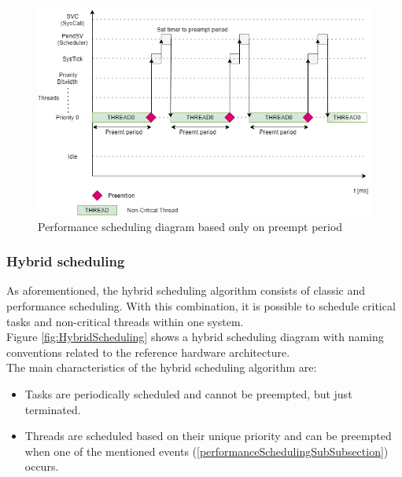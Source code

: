 \begin{figure}[H]
\begin{center}
\includegraphics[width=1\textwidth]{images/performance_scheduling.png}
\caption{Performance scheduling diagram based only on preempt period}
\label{fig:PerformanceScheduling}
\end{center}
\end{figure}

\subsubsection{Hybrid scheduling}
As aforementioned, the hybrid scheduling algorithm consists of classic and performance scheduling. With this combination, it is possible to schedule critical tasks and non-critical threads within one system. \\
\indent Figure \ref{fig:HybridScheduling} shows a hybrid scheduling diagram with naming conventions related to the reference hardware architecture.\\
\indent The main characteristics of the hybrid scheduling algorithm are:
\begin{itemize}
\vspace{-0.2cm}\item Tasks are periodically scheduled and cannot be preempted, but just terminated.
\vspace{-0.2cm}\item Threads are scheduled based on their unique priority and can be preempted when one of the mentioned events (\ref{performanceSchedulingSubSubsection}) occurs.
\end{itemize}


